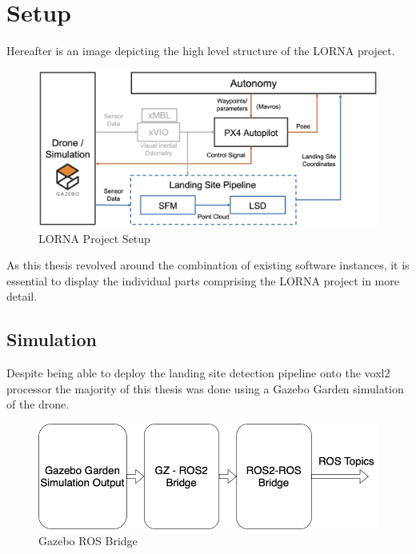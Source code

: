 \chapter{Setup}

Hereafter is an image depicting the high level structure of the LORNA project.

\begin{figure}[ht]
    \centering
    \includegraphics[scale=0.18]{images/setup/setup_flowchart.png}
    \caption{LORNA Project Setup}
    \label{fig:lorna_setup}
\end{figure}

As this thesis revolved around the combination of existing software instances, it is essential to display the individual parts comprising the LORNA project in more detail.

\clearpage %
\section{Simulation}

Despite being able to deploy the landing site detection pipeline onto the voxl2 processor the majority of this thesis was done using a Gazebo Garden simulation of the drone. 

\begin{figure}[ht!]
    \centering
    \includegraphics[scale=0.45]{images/setup/GZ_flowchart.png}
    \caption{Gazebo ROS Bridge}
\end{figure}


